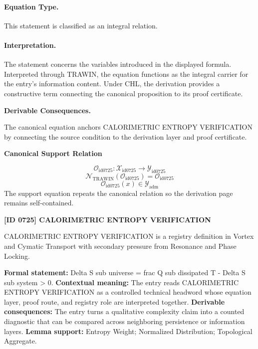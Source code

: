 \paragraph{Equation Type.}
This statement is classified as an integral relation.

\paragraph{Interpretation.}
The statement concerns the variables introduced in the displayed formula. Interpreted through TRAWIN, the equation functions as the integral carrier for the entry’s information content. Under CHL, the derivation provides a constructive term connecting the canonical proposition to its proof certificate.

\par\vspace{0.35em}
\noindent\textbf{Derivable Consequences.}\quad
\begingroup
\footnotesize
\raggedright
The canonical equation anchors CALORIMETRIC ENTROPY VERIFICATION by connecting the source condition to the derivation layer and proof certificate.
\par\endgroup

\noindent\textbf{Canonical Support Relation}\par
\[
\mathcal{O}_{\mathrm{id0725}}:\mathcal{X}_{\mathrm{id0725}}\longrightarrow\mathcal{Y}_{\mathrm{id0725}}
\]
\[
\mathcal{N}_{\mathrm{TRAWIN}}(\mathcal{O}_{\mathrm{id0725}})=\mathcal{O}_{\mathrm{id0725}}
\]
\[
\mathcal{O}_{\mathrm{id0725}}(x)\in\mathcal{Y}_{\mathrm{adm}}
\]
\noindent The support equation repeats the canonical relation so the derivation page remains self-contained.\par

\clearpage
\noindent\textbf{[ID 0725] CALORIMETRIC ENTROPY VERIFICATION}\par
\vspace{0.35em}
\begingroup\small
{}
CALORIMETRIC ENTROPY VERIFICATION is a registry definition in Vortex and Cymatic Transport with secondary pressure from Resonance and Phase Locking.

\begingroup\footnotesize\setlength{\emergencystretch}{3em}\sloppy
\textbf{Formal statement:} Delta S sub universe = frac Q sub dissipated T - Delta S sub system > 0. \textbf{Contextual meaning:} The entry reads CALORIMETRIC ENTROPY VERIFICATION as a controlled technical headword whose equation layer, proof route, and registry role are interpreted together. \textbf{Derivable consequences:} The entry turns a qualitative complexity claim into a counted diagnostic that can be compared across neighboring persistence or information layers. \textbf{Lemma support:} Entropy Weight; Normalized Distribution; Topological Aggregate.\par
\endgroup

